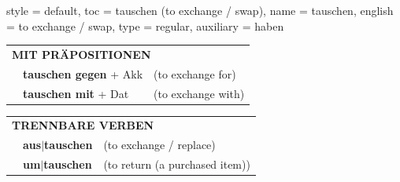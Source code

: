 \begin{verbentry}{
  style = {default},
  toc = {tauschen (to exchange / swap)},
  name = {tauschen},
  english = {to exchange / swap},
  type = {regular},
  auxiliary = {haben}
}
\vspace{10pt}

\begin{tabular}{lll}
\multicolumn{3}{l}{\textbf{MIT PRÄPOSITIONEN}}\\
& \textbf{tauschen gegen} + Akk & (to exchange for)\\
& \textbf{tauschen mit} + Dat & (to exchange with)\\
\end{tabular}
\hfill
\begin{tabular}{lll}
\multicolumn{3}{l}{\textbf{TRENNBARE VERBEN}}\\
& \textbf{aus$|$tauschen} & (to exchange / replace)\\
& \textbf{um$|$tauschen} & (to return (a purchased item))\\
\end{tabular}
\vspace{-5pt}
\end{verbentry}

